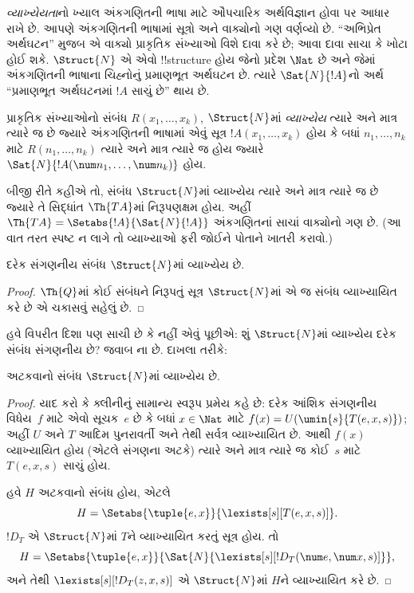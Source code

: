 \documentclass[../../../include/open-logic-section]{subfiles}
\begin{document}


\emph{વ્યાખ્યેયતા}નો ખ્યાલ અંકગણિતની ભાષા માટે ઔપચારિક અર્થવિજ્ઞાન હોવા પર આધાર રાખે છે. આપણે અંકગણિતની ભાષામાં સૂત્રો અને વાક્યોનો ગણ વર્ણવ્યો છે. ``અભિપ્રેત અર્થઘટન'' મુજબ એ વાક્યો પ્રાકૃતિક સંખ્યાઓ વિશે દાવા કરે છે; આવા દાવા સાચા કે ખોટા હોઈ શકે. $\Struct{N}$ એ એવો !!{structure} હોય જેનો પ્રદેશ $\Nat$ છે અને જેમાં અંકગણિતની ભાષાના ચિહ્નોનું પ્રમાણભૂત અર્થઘટન છે. ત્યારે $\Sat{N}{!A}$નો અર્થ ``પ્રમાણભૂત અર્થઘટનમાં $!A$ સાચું છે'' થાય છે.

\begin{defn}
પ્રાકૃતિક સંખ્યાઓનો સંબંધ $R(x_1,\dots,x_k)$, $\Struct{N}$માં \emph{વ્યાખ્યેય} ત્યારે અને માત્ર ત્યારે જ છે જ્યારે અંકગણિતની ભાષામાં એવું સૂત્ર $!A(x_1,\dots,x_k)$ હોય કે બધાં $n_1,\dots,n_k$ માટે $R(n_1,\dots,n_k)$ ત્યારે અને માત્ર ત્યારે જ હોય જ્યારે $\Sat{N}{!A(\num n_1,\dots,\num n_k)}$ હોય.
\end{defn}

બીજી રીતે કહીએ તો, સંબંધ $\Struct{N}$માં વ્યાખ્યેય ત્યારે અને માત્ર ત્યારે જ છે જ્યારે તે સિદ્ધાંત $\Th{TA}$માં નિરૂપણક્ષમ હોય. અહીં $\Th{TA} = \Setabs{!A}{\Sat{N}{!A}}$ અંકગણિતનાં સાચાં વાક્યોનો ગણ છે. (આ વાત તરત સ્પષ્ટ ન લાગે તો વ્યાખ્યાઓ ફરી જોઈને પોતાને ખાતરી કરાવો.)

\begin{lem}
દરેક સંગણનીય સંબંધ $\Struct{N}$માં વ્યાખ્યેય છે.
\end{lem}

\begin{proof}
$\Th{Q}$માં કોઈ સંબંધને નિરૂપતું સૂત્ર $\Struct{N}$માં એ જ સંબંધ વ્યાખ્યાયિત કરે છે એ ચકાસવું સહેલું છે.
\end{proof}

હવે વિપરીત દિશા પણ સાચી છે કે નહીં એવું પૂછીએ: શું $\Struct{N}$માં વ્યાખ્યેય દરેક સંબંધ સંગણનીય છે? જવાબ ના છે. દાખલા તરીકે:

\begin{lem}
અટકવાનો સંબંધ $\Struct{N}$માં વ્યાખ્યેય છે.
\end{lem}

\begin{proof}
યાદ કરો કે ક્લીનીનું સામાન્ય સ્વરૂપ પ્રમેય કહે છે: દરેક આંશિક સંગણનીય વિધેય~$f$ માટે એવો સૂચક~$e$ છે કે બધાં $x \in \Nat$ માટે $f(x) = U(\umin{s}{T(e,x,s)})$; અહીં $U$ અને $T$ આદિમ પુનરાવર્તી અને તેથી સર્વત્ર વ્યાખ્યાયિત છે. આથી $f(x)$ વ્યાખ્યાયિત હોય (એટલે સંગણના અટકે) ત્યારે અને માત્ર ત્યારે જ કોઈ~$s$ માટે $T(e,x,s)$ સાચું હોય.

હવે $H$ અટકવાનો સંબંધ હોય, એટલે
\[
H = \Setabs{\tuple{e,x}}{\lexists[s][T(e, x, s)]}.
\]
$!D_T$ એ $\Struct{N}$માં $T$ને વ્યાખ્યાયિત કરતું સૂત્ર હોય. તો
\[
H = \Setabs{\tuple{e,x}}{\Sat{N}{\lexists[s][!D_T(\num e, \num x, s)]}},
\]
અને તેથી $\lexists[s][!D_T(z, x, s)]$ એ $\Struct{N}$માં $H$ને વ્યાખ્યાયિત કરે છે.
\end{proof}
\end{document}
